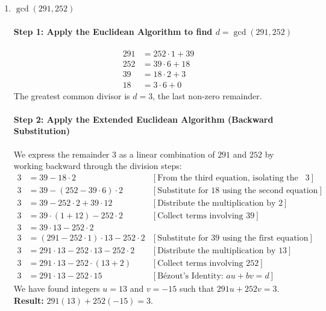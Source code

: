 \begin{enumerate}
    \item \textbf{$\gcd(291, 252)$}

    \paragraph{Step 1: Apply the Euclidean Algorithm to find $d = \gcd(291, 252)$}
    \begin{align*}
        291 &= 252 \cdot 1 + 39 \\
        252 &= 39 \cdot 6 + 18 \\
        39 &= 18 \cdot 2 + 3 \\
        18 &= 3 \cdot 6 + 0
    \end{align*}
    The greatest common divisor is $d=3$, the last non-zero remainder.

    \paragraph{Step 2: Apply the Extended Euclidean Algorithm (Backward Substitution)}
    We express the remainder $3$ as a linear combination of $291$ and $252$ by working backward through the division steps:
    \begin{align*}
        3 &= 39 - 18 \cdot 2 & [\text{From the third equation, isolating the remainder } 3] \\
        3 &= 39 - (252 - 39 \cdot 6) \cdot 2 & [\text{Substitute for } 18 \text{ using the second equation}] \\
        3 &= 39 - 252 \cdot 2 + 39 \cdot 12 & [\text{Distribute the multiplication by } 2] \\
        3 &= 39 \cdot (1 + 12) - 252 \cdot 2 & [\text{Collect terms involving } 39] \\
        3 &= 39 \cdot 13 - 252 \cdot 2 \\
        3 &= (291 - 252 \cdot 1) \cdot 13 - 252 \cdot 2 & [\text{Substitute for } 39 \text{ using the first equation}] \\
        3 &= 291 \cdot 13 - 252 \cdot 13 - 252 \cdot 2 & [\text{Distribute the multiplication by } 13] \\
        3 &= 291 \cdot 13 - 252 \cdot (13 + 2) & [\text{Collect terms involving } 252] \\
        3 &= 291 \cdot 13 - 252 \cdot 15 & [\text{Bézout's Identity: } au+bv=d]
    \end{align*}
    We have found integers $u=13$ and $v=-15$ such that $291u + 252v = 3$.
    \textbf{Result:} $291(13) + 252(-15) = 3$.
\end{enumerate}
\newpage
